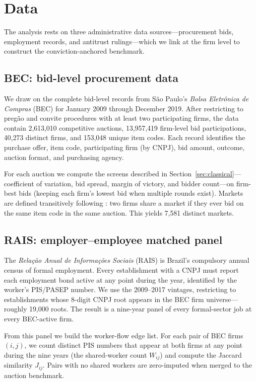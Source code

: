 \section{Data}\label{data}

The analysis rests on three administrative data sources---procurement bids, employment records, and antitrust rulings---which we link at the firm level to construct the conviction-anchored benchmark.

\subsection{BEC: bid-level procurement data}

We draw on the complete bid-level records from S\~{a}o Paulo's \emph{Bolsa Eletr\^{o}nica de Compras} (BEC) for January 2009 through December 2019. After restricting to preg\~{a}o and convite procedures with at least two participating firms, the data contain 2{,}613{,}010 competitive auctions, 13{,}957{,}419 firm-level bid participations, 40{,}273 distinct firms, and 153{,}048 unique item codes. Each record identifies the purchase offer, item code, participating firm (by CNPJ), bid amount, outcome, auction format, and purchasing agency.

For each auction we compute the screens described in Section~\ref{sec:classical}---coefficient of variation, bid spread, margin of victory, and bidder count---on firm-best bids (keeping each firm's lowest bid when multiple rounds exist). Markets are defined transitively following \citet{kawai2023using}: two firms share a market if they ever bid on the same item code in the same auction. This yields 7{,}581 distinct markets.

\subsection{RAIS: employer--employee matched panel}

The \emph{Rela\c{c}\~{a}o Anual de Informa\c{c}\~{o}es Sociais} (RAIS) is Brazil's compulsory annual census of formal employment. Every establishment with a CNPJ must report each employment bond active at any point during the year, identified by the worker's PIS/PASEP number. We use the 2009--2017 vintages, restricting to establishments whose 8-digit CNPJ root appears in the BEC firm universe---roughly 19{,}000 roots. The result is a nine-year panel of every formal-sector job at every BEC-active firm.

From this panel we build the worker-flow edge list. For each pair of BEC firms $(i, j)$, we count distinct PIS numbers that appear at both firms at any point during the nine years (the shared-worker count $W_{ij}$) and compute the Jaccard similarity $J_{ij}$. Pairs with no shared workers are zero-imputed when merged to the auction benchmark.

